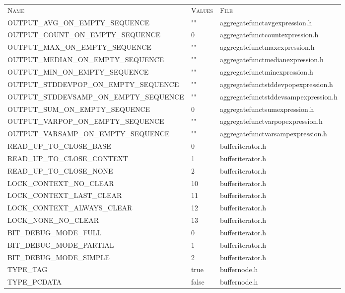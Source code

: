 \begin{tiny}
\begin{longtable}[ht]{|p{0.45\tablwidth}|p{0.15\tablwidth}|p{0.3\tablwidth}|}
  \hline \cellcolor{tablefirstrowcolor} \textsc{Name} & \cellcolor{tablefirstrowcolor} \textsc{Values} & \cellcolor{tablefirstrowcolor} \textsc{File} \\
  \mythickhline OUTPUT\_AVG\_ON\_EMPTY\_SEQUENCE & "" & aggregatefunctavgexpression.h \\
  \hline OUTPUT\_COUNT\_ON\_EMPTY\_SEQUENCE & 0 & aggregatefunctcountexpression.h \\
  \hline OUTPUT\_MAX\_ON\_EMPTY\_SEQUENCE & "" & aggregatefunctmaxexpression.h \\
  \hline OUTPUT\_MEDIAN\_ON\_EMPTY\_SEQUENCE & "" & aggregatefunctmedianexpression.h \\
  \hline OUTPUT\_MIN\_ON\_EMPTY\_SEQUENCE & "" & aggregatefunctminexpression.h \\
  \hline OUTPUT\_STDDEVPOP\_ON\_EMPTY\_SEQUENCE & "" & aggregatefunctstddevpopexpression.h \\
  \hline OUTPUT\_STDDEVSAMP\_ON\_EMPTY\_SEQUENCE & "" & aggregatefunctstddevsampexpression.h \\
  \hline OUTPUT\_SUM\_ON\_EMPTY\_SEQUENCE & 0 & aggregatefunctsumexpression.h \\
  \hline OUTPUT\_VARPOP\_ON\_EMPTY\_SEQUENCE & "" & aggregatefunctvarpopexpression.h \\
  \hline OUTPUT\_VARSAMP\_ON\_EMPTY\_SEQUENCE & "" & aggregatefunctvarsampexpression.h \\
  \mythickhline READ\_UP\_TO\_CLOSE\_BASE & 0 & bufferiterator.h \\
  \hline READ\_UP\_TO\_CLOSE\_CONTEXT & 1 & bufferiterator.h \\
  \hline READ\_UP\_TO\_CLOSE\_NONE & 2 & bufferiterator.h \\
  \mythickhline LOCK\_CONTEXT\_NO\_CLEAR & 10 & bufferiterator.h \\
  \hline LOCK\_CONTEXT\_LAST\_CLEAR & 11 & bufferiterator.h \\
  \hline LOCK\_CONTEXT\_ALWAYS\_CLEAR & 12 & bufferiterator.h \\
  \hline LOCK\_NONE\_NO\_CLEAR & 13 & bufferiterator.h \\
  \mythickhline BIT\_DEBUG\_MODE\_FULL & 0 & bufferiterator.h \\
  \hline BIT\_DEBUG\_MODE\_PARTIAL & 1 & bufferiterator.h \\
  \hline BIT\_DEBUG\_MODE\_SIMPLE & 2 & bufferiterator.h \\
  \mythickhline TYPE\_TAG & true & buffernode.h \\
  \hline TYPE\_PCDATA & false & buffernode.h \\

\end{longtable}
\end{tiny}

